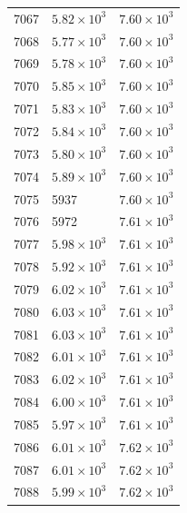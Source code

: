 \begin{table}[H]
\begin{tabular}{lll}
7067 & $\displaystyle 5.82 \times 10^{3}$ & $\displaystyle 7.60 \times 10^{3}$ \\
7068 & $\displaystyle 5.77 \times 10^{3}$ & $\displaystyle 7.60 \times 10^{3}$ \\
7069 & $\displaystyle 5.78 \times 10^{3}$ & $\displaystyle 7.60 \times 10^{3}$ \\
7070 & $\displaystyle 5.85 \times 10^{3}$ & $\displaystyle 7.60 \times 10^{3}$ \\
7071 & $\displaystyle 5.83 \times 10^{3}$ & $\displaystyle 7.60 \times 10^{3}$ \\
7072 & $\displaystyle 5.84 \times 10^{3}$ & $\displaystyle 7.60 \times 10^{3}$ \\
7073 & $\displaystyle 5.80 \times 10^{3}$ & $\displaystyle 7.60 \times 10^{3}$ \\
7074 & $\displaystyle 5.89 \times 10^{3}$ & $\displaystyle 7.60 \times 10^{3}$ \\
7075 & 5937 & $\displaystyle 7.60 \times 10^{3}$ \\
7076 & 5972 & $\displaystyle 7.61 \times 10^{3}$ \\
7077 & $\displaystyle 5.98 \times 10^{3}$ & $\displaystyle 7.61 \times 10^{3}$ \\
7078 & $\displaystyle 5.92 \times 10^{3}$ & $\displaystyle 7.61 \times 10^{3}$ \\
7079 & $\displaystyle 6.02 \times 10^{3}$ & $\displaystyle 7.61 \times 10^{3}$ \\
7080 & $\displaystyle 6.03 \times 10^{3}$ & $\displaystyle 7.61 \times 10^{3}$ \\
7081 & $\displaystyle 6.03 \times 10^{3}$ & $\displaystyle 7.61 \times 10^{3}$ \\
7082 & $\displaystyle 6.01 \times 10^{3}$ & $\displaystyle 7.61 \times 10^{3}$ \\
7083 & $\displaystyle 6.02 \times 10^{3}$ & $\displaystyle 7.61 \times 10^{3}$ \\
7084 & $\displaystyle 6.00 \times 10^{3}$ & $\displaystyle 7.61 \times 10^{3}$ \\
7085 & $\displaystyle 5.97 \times 10^{3}$ & $\displaystyle 7.61 \times 10^{3}$ \\
7086 & $\displaystyle 6.01 \times 10^{3}$ & $\displaystyle 7.62 \times 10^{3}$ \\
7087 & $\displaystyle 6.01 \times 10^{3}$ & $\displaystyle 7.62 \times 10^{3}$ \\
7088 & $\displaystyle 5.99 \times 10^{3}$ & $\displaystyle 7.62 \times 10^{3}$ \\

\end{tabular}
\end{table}
